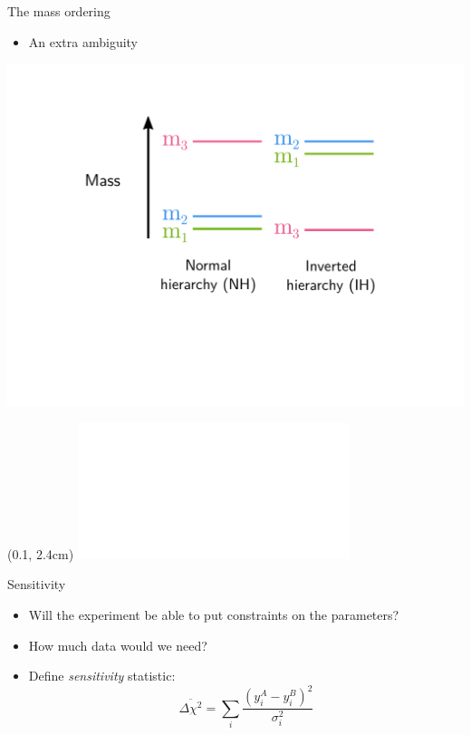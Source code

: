 \documentclass{beamer}
\begin{document}
\begin{frame}{The mass ordering}

	\vspace{1cm}
	\begin{itemize}
		\item An extra ambiguity
	\end{itemize}

	\vspace{-0.5cm}
		\includegraphics[width=\textwidth]{hierarchy.pdf}


	\begin{textblock*}{0.9\textwidth}(0.1\textwidth, 2.4cm)
		\includegraphics<2->[width=\textwidth]{parameters_mh.pdf}
	\end{textblock*}

\end{frame}



\begin{frame}{Sensitivity}

	\begin{itemize}
		\item Will the experiment be able to put constraints on the parameters?
		\item How much data would we need? 
		\item Define \emph{sensitivity} statistic: 
			$$\overline{\Delta \chi^2} = \sum_i \frac{(y^A_i - y^B_i)^2}{\sigma^2_i}$$

	\end{itemize}

\end{frame}
\end{document}
